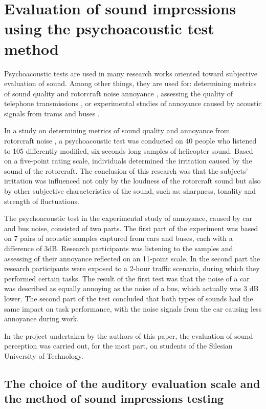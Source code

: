 \documentclass[a4paper,10pt]{article}
\begin{document}
\section{Evaluation of sound impressions using the psychoacoustic test method}

\begin{multicols}{2}
  Psychoacoustic tests are used in many research works oriented toward
  subjective evaluation of sound. Among other things, they are used for:
  determining metrics of sound quality and rotorcraft noise annoyance
  \cite{Krishnamurthy:2018}, assessing the quality of telephone transmissions
  \cite{ITU-T:P800}, or experimental studies of annoyance caused by acoustic
  signals from trams and buses \cite{Sandrock:2008}. 

  In a study on determining metrics of sound quality and annoyance from
  rotorcraft noise \cite{Krishnamurthy:2018}, a psychoacoustic test was
  conducted on 40 people who listened to 105 differently modified, six-seconds
  long samples of helicopter sound. Based on a five-point rating scale,
  individuals determined the irritation caused by the sound of the rotorcraft.
  The conclusion of this research was that the subjects' irritation was
  influenced not only by the loudness of the rotorcraft sound but also by other
  subjective characteristics of the sound, such as: sharpness, tonality and
  strength of fluctuations.

  The psychoacoustic test in the experimental study of annoyance, caused by car
  and bus noise, consisted of two parts. The first part of the experiment was
  based on 7 pairs of acoustic samples captured from cars and buses, each with a
  difference of 3dB. Research participants was listening to the samples and
  assessing of their annoyance reflected on an 11-point scale. In the second
  part the research participants were exposed to a 2-hour traffic scenario,
  during which they performed certain tasks. The result of the first test was
  that the noise of a car was described as equally annoying as the noise of a
  bus, which actually was 3 dB lower. The second part of the test concluded that
  both types of sounds had the same impact on task performance, with the noise
  signals from the car causing less annoyance during work.

  In the project undertaken by the authors of this paper, the evaluation of
  sound perception was carried out, for the most part, on students of the
  Silesian University of Technology.

  \subsection*{The choice of the auditory evaluation scale and the method of sound impressions testing}


\end{multicols}
\end{document}
